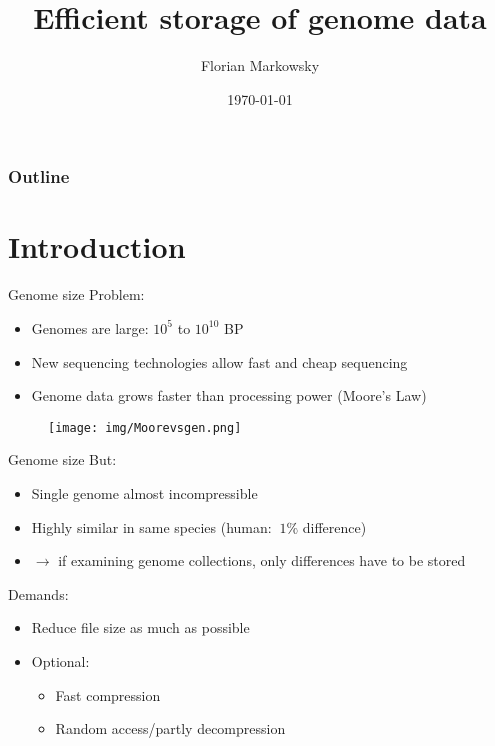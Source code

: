 \documentclass[aspectratio=1610]{beamer}
\author{Florian Markowsky}
\title{Efficient storage of genome data}
\date{\today}
\begin{document}
\begin{frame}

\titlepage
\end{frame}

\begin{frame}
	\frametitle{Outline}
	\tableofcontents
\end{frame}

\section{Introduction}

\begin{frame}{Genome size}
  Problem: 
  \begin{itemize}
    \item Genomes are large: $10^5$ to $10^{10}$ BP
    \item New sequencing technologies allow fast and cheap sequencing
    \item Genome data grows faster than processing power (Moore's Law)
  \end{itemize}%
      \begin{figure}
        \texttt{[image: img/Moorevsgen.png]}
      \end{figure}
\end{frame}

\begin{frame}{Genome size}
  But:
  \begin{itemize}
    \item Single genome almost incompressible
    \item Highly similar in same species (human: $~1\%$ difference)
    \item $\rightarrow$ if examining genome collections, only differences have to be stored
  \end{itemize}
  \vspace{0.5cm}
  Demands:
  \begin{itemize}
    \item Reduce file size as much as possible
    \item Optional:
      \begin{itemize}
        \item Fast compression
        \item Random access/partly decompression
      \end{itemize}
  \end{itemize}
\end{frame}
\end{document}
